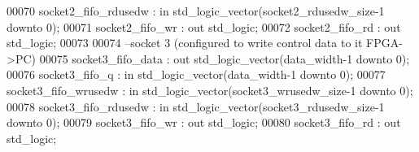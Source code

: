 \begin{DoxyCode}
00070         \textcolor{vhdlchar}{socket2_fifo_rdusedw}        \textcolor{vhdlchar}{:} \textcolor{keywordflow}{in} \textcolor{comment}{std\_logic\_vector}\textcolor{vhdlchar}{(}\textcolor{vhdlchar}{socket2_rdusedw_size}\textcolor{vhdlchar}{-}\textcolor{vhdllogic}{}\textcolor{vhdllogic}{1} \textcolor{keywordflow}{downto} \textcolor{vhdllogic}{}\textcolor{vhdllogic}{0}\textcolor{vhdlchar}{)};
00071         \textcolor{vhdlchar}{socket2_fifo_wr}         \textcolor{vhdlchar}{:} \textcolor{keywordflow}{out} \textcolor{comment}{std\_logic};
00072         \textcolor{vhdlchar}{socket2_fifo_rd}         \textcolor{vhdlchar}{:} \textcolor{keywordflow}{out} \textcolor{comment}{std\_logic};
00073 
00074 \textcolor{keyword}{        --socket 3 (configured to write control data to it FPGA->PC)}
00075         \textcolor{vhdlchar}{socket3_fifo_data}           \textcolor{vhdlchar}{:} \textcolor{keywordflow}{out} \textcolor{comment}{std\_logic\_vector}\textcolor{vhdlchar}{(}\textcolor{vhdlchar}{data_width}\textcolor{vhdlchar}{-}\textcolor{vhdllogic}{}\textcolor{vhdllogic}{1} \textcolor{keywordflow}{downto} \textcolor{vhdllogic}{}\textcolor{vhdllogic}{0}\textcolor{vhdlchar}{)};
00076         \textcolor{vhdlchar}{socket3_fifo_q}              \textcolor{vhdlchar}{:} \textcolor{keywordflow}{in} \textcolor{comment}{std\_logic\_vector}\textcolor{vhdlchar}{(}\textcolor{vhdlchar}{data_width}\textcolor{vhdlchar}{-}\textcolor{vhdllogic}{}\textcolor{vhdllogic}{1} \textcolor{keywordflow}{downto} \textcolor{vhdllogic}{}\textcolor{vhdllogic}{0}\textcolor{vhdlchar}{)};
00077         \textcolor{vhdlchar}{socket3_fifo_wrusedw}        \textcolor{vhdlchar}{:} \textcolor{keywordflow}{in} \textcolor{comment}{std\_logic\_vector}\textcolor{vhdlchar}{(}\textcolor{vhdlchar}{socket3_wrusedw_size}\textcolor{vhdlchar}{-}\textcolor{vhdllogic}{}\textcolor{vhdllogic}{1} \textcolor{keywordflow}{downto} \textcolor{vhdllogic}{}\textcolor{vhdllogic}{0}\textcolor{vhdlchar}{)};
00078         \textcolor{vhdlchar}{socket3_fifo_rdusedw}        \textcolor{vhdlchar}{:} \textcolor{keywordflow}{in} \textcolor{comment}{std\_logic\_vector}\textcolor{vhdlchar}{(}\textcolor{vhdlchar}{socket3_rdusedw_size}\textcolor{vhdlchar}{-}\textcolor{vhdllogic}{}\textcolor{vhdllogic}{1} \textcolor{keywordflow}{downto} \textcolor{vhdllogic}{}\textcolor{vhdllogic}{0}\textcolor{vhdlchar}{)};
00079         \textcolor{vhdlchar}{socket3_fifo_wr}         \textcolor{vhdlchar}{:} \textcolor{keywordflow}{out} \textcolor{comment}{std\_logic};
00080         \textcolor{vhdlchar}{socket3_fifo_rd}         \textcolor{vhdlchar}{:} \textcolor{keywordflow}{out} \textcolor{comment}{std\_logic};

\end{DoxyCode}
